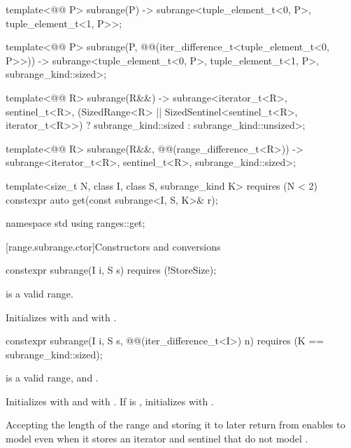\begin{codeblock}
{  template<@@ P>
    subrange(P) -> subrange<tuple_element_t<0, P>, tuple_element_t<1, P>>;

  template<@@ P>
    subrange(P, @@(iter_difference_t<tuple_element_t<0, P>>)) ->
      subrange<tuple_element_t<0, P>, tuple_element_t<1, P>, subrange_kind::sized>;

  template<@@ R>
    subrange(R&&) ->
      subrange<iterator_t<R>, sentinel_t<R>,
               (SizedRange<R> || SizedSentinel<sentinel_t<R>, iterator_t<R>>)
                 ? subrange_kind::sized : subrange_kind::unsized>;

  template<@@ R>
    subrange(R&&, @@(range_difference_t<R>)) ->
      subrange<iterator_t<R>, sentinel_t<R>, subrange_kind::sized>;

  template<size_t N, class I, class S, subrange_kind K>
    requires (N < 2)
  constexpr auto get(const subrange<I, S, K>& r);
}

namespace std {
  using ranges::get;
}
\end{codeblock}

[range.subrange.ctor]{Constructors and conversions}

%
\begin{itemdecl}
constexpr subrange(I i, S s) requires (!StoreSize);
\end{itemdecl}

\begin{itemdescr}
\pnum
\expects {} is a valid range.

\pnum
\effects Initializes  with  and  with
.
\end{itemdescr}

%
\begin{itemdecl}
constexpr subrange(I i, S s, @@(iter_difference_t<I>) n)
  requires (K == subrange_kind::sized);
\end{itemdecl}

\begin{itemdescr}
\pnum
\expects {} is a valid range, and
.

\pnum
\effects Initializes  with  and  with
. If  is , initializes  with
.

\pnum
\begin{note}
Accepting the length of the range and storing it to later return  from
 enables  to model  even
when it stores an iterator and sentinel that do not model
.
\end{note}
\end{itemdescr}

